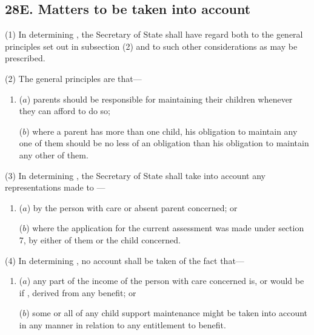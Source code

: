 \documentclass[a4paper]{article}
\begin{document}
\subsection{28E. Matters to be taken into account}

(1) In determining , the Secretary of State shall have regard both to the general principles set out in subsection (2) and to such other considerations as may be prescribed.

(2) The general principles are that---
\begin{enumerate}\item[]
($a$) parents should be responsible for maintaining their children whenever they can afford to do so;

($b$) where a parent has more than one child, his obligation to maintain any one of them should be no less of an obligation than his obligation to maintain any other of them.
\end{enumerate}

(3) In determining , the Secretary of State shall take into account any representations made to —
\begin{enumerate}\item[]
($a$) by the person with care or absent parent concerned; or

($b$) where the application for the current assessment was made under section 7, by either of them or the child concerned.
\end{enumerate}

(4) In determining , no account shall be taken of the fact that—
\begin{enumerate}\item[]
($a$) any part of the income of the person with care concerned is, or would be if , derived from any benefit; or

($b$) some or all of any child support maintenance might be taken into account in any manner in relation to any entitlement to benefit.
\end{enumerate}
\end{document}
